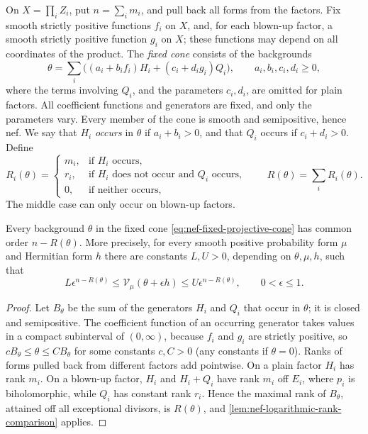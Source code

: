 On $X=\prod_i Z_i$, put $n=\sum_i m_i$, and pull back all forms from the factors. Fix smooth strictly positive functions $f_i$ on $X$, and, for each blown-up factor, a smooth strictly positive function $g_i$ on $X$; these functions may depend on all coordinates of the product. The \emph{fixed cone} consists of the backgrounds
\begin{equation}\label{eq:nef-fixed-projective-cone}
 \theta=\sum_i\bigl((a_i+b_if_i)H_i+(c_i+d_ig_i)Q_i\bigr),
 \qquad a_i,b_i,c_i,d_i\geq0,
\end{equation}
where the terms involving $Q_i$, and the parameters $c_i,d_i$, are omitted for plain factors. All coefficient functions and generators are fixed, and only the parameters vary. Every member of the cone is smooth and semipositive, hence nef. We say that $H_i$ \emph{occurs} in $\theta$ if $a_i+b_i>0$, and that $Q_i$ occurs if $c_i+d_i>0$. Define
\begin{equation}\label{eq:nef-projective-effective-rank}
 R_i(\theta)=
 \begin{cases}
 m_i,&\text{if }H_i\text{ occurs},\\
 r_i,&\text{if }H_i\text{ does not occur and }Q_i\text{ occurs},\\
 0,&\text{if neither occurs},
 \end{cases}
 \qquad R(\theta)=\sum_i R_i(\theta).
\end{equation}
The middle case can only occur on blown-up factors.

\begin{theorem}\label{thm:nef-projective-integer-orders}
Every background $\theta$ in the fixed cone \eqref{eq:nef-fixed-projective-cone} has common order $n-R(\theta)$. More precisely, for every smooth positive probability form $\mu$ and Hermitian form $h$ there are constants $L,U>0$, depending on $\theta,\mu,h$, such that
\begin{equation}\label{eq:nef-projective-power-bounds}
 L\epsilon^{n-R(\theta)}
 \leq\mathcal V_\mu(\theta+\epsilon h)
 \leq U\epsilon^{n-R(\theta)},\qquad 0<\epsilon\leq1.
\end{equation}
\end{theorem}
\begin{proof}
Let $B_\theta$ be the sum of the generators $H_i$ and $Q_i$ that occur in $\theta$; it is closed and semipositive. The coefficient function of an occurring generator takes values in a compact subinterval of $(0,\infty)$, because $f_i$ and $g_i$ are strictly positive, so $cB_\theta\leq\theta\leq CB_\theta$ for some constants $c,C>0$ (any constants if $\theta=0$). Ranks of forms pulled back from different factors add pointwise. On a plain factor $H_i$ has rank $m_i$. On a blown-up factor, $H_i$ and $H_i+Q_i$ have rank $m_i$ off $E_i$, where $p_i$ is biholomorphic, while $Q_i$ has constant rank $r_i$. Hence the maximal rank of $B_\theta$, attained off all exceptional divisors, is $R(\theta)$, and \cref{lem:nef-logarithmic-rank-comparison} applies.
\end{proof}


